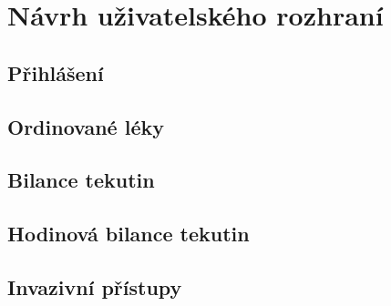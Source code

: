 \setlength{\parskip}{1em}

\chapter{Návrh uživatelského rozhraní}



\section{Přihlášení}

\section{Ordinované léky}

\section{Bilance tekutin}

\section{Hodinová bilance tekutin}

\section{Invazivní přístupy}